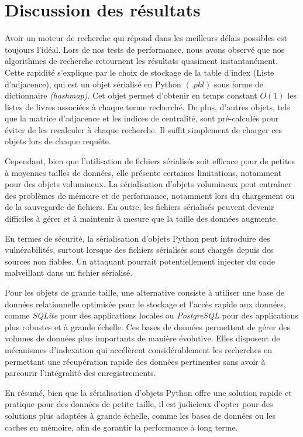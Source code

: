 \documentclass{article}
\begin{document}
\newpage
\section{Discussion des résultats}
Avoir un moteur de recherche qui répond dans les meilleurs délais possibles est toujours l’idéal. Lors de nos tests de performance, nous avons observé que nos algorithmes de recherche retournent les résultats quasiment instantanément. Cette rapidité s'explique par le choix de stockage de la table d’index (Liste d’adjacence), qui est un objet sérialisé en Python $(.pkl)$ sous forme de dictionnaire \textit{(hashmap)}. Cet objet permet d’obtenir en temps constant $O(1)$ les listes de livres associées à chaque terme recherché. De plus, d’autres objets, tels que la matrice d’adjacence et les indices de centralité, sont pré-calculés pour éviter de les recalculer à chaque recherche. Il suffit simplement de charger ces objets lors de chaque requête.

Cependant, bien que l’utilisation de fichiers sérialisés soit efficace pour de petites à moyennes tailles de données, elle présente certaines limitations, notamment pour des objets volumineux. La sérialisation d’objets volumineux peut entraîner des problèmes de mémoire et de performance, notamment lors du chargement ou de la sauvegarde de fichiers. En outre, les fichiers sérialisés peuvent devenir difficiles à gérer et à maintenir à mesure que la taille des données augmente.

En termes de sécurité, la sérialisation d’objets Python peut introduire des vulnérabilités, surtout lorsque des fichiers sérialisés sont chargés depuis des sources non fiables. Un attaquant pourrait potentiellement injecter du code malveillant dans un fichier sérialisé.

Pour les objets de grande taille, une alternative consiste à utiliser une base de données relationnelle optimisée pour le stockage et l’accès rapide aux données, comme \textit{SQLite} pour des applications locales ou \textit{PostgreSQL} pour des applications plus robustes et à grande échelle. Ces bases de données permettent de gérer des volumes de données plus importants de manière évolutive. Elles disposent de mécanismes d’indexation qui accélèrent considérablement les recherches en permettant une récupération rapide des données pertinentes sans avoir à parcourir l’intégralité des enregistrements.

En résumé, bien que la sérialisation d’objets Python offre une solution rapide et pratique pour des données de petite taille, il est judicieux d’opter pour des solutions plus adaptées à grande échelle, comme les bases de données ou les caches en mémoire, afin de garantir la performance à long terme.
\end{document}

